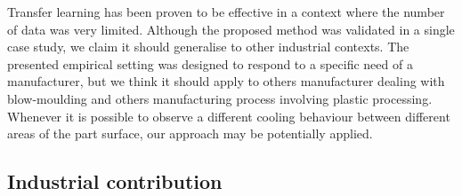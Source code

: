 Transfer learning has been proven to be effective in a context where the number of data was very limited. Although the proposed method was validated in a single case study, we claim it should generalise to other industrial contexts. The presented empirical setting was designed to respond to a specific need of a manufacturer, but we think it should apply to others manufacturer dealing with blow-moulding and others manufacturing process involving plastic processing. Whenever it is possible to observe a different cooling behaviour between different areas of the part surface, our approach may be potentially applied.


\subsection{Industrial contribution}

